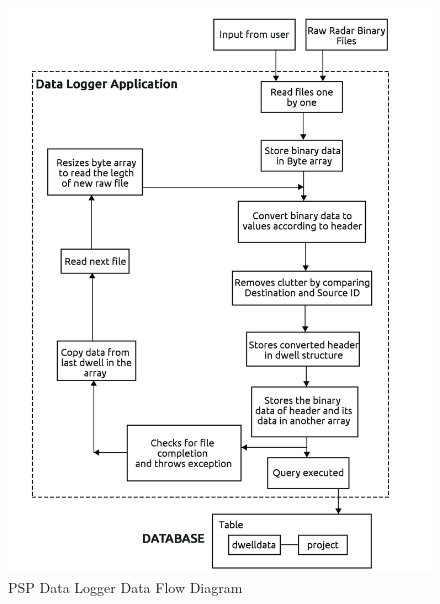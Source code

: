 \documentclass[12pt]{article} %
\begin{document}
\begin{figure}[H]
  \includegraphics[width=\linewidth]{flow-diagram.jpg}
  \caption{PSP Data Logger Data Flow Diagram}
  \label{fig:figure 18}
\end{figure}
\end{document}
